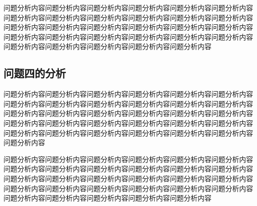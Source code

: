 问题分析内容问题分析内容问题分析内容问题分析内容问题分析内容问题分析内容问题分析内容问题分析内容问题分析内容问题分析内容问题分析内容问题分析内容问题分析内容问题分析内容问题分析内容问题分析内容问题分析内容问题分析内容问题分析内容问题分析内容问题分析内容问题分析内容问题分析内容问题分析内容问题分析内容问题分析内容问题分析内容问题分析内容问题分析内容

\subsection{问题四的分析}

问题分析内容问题分析内容问题分析内容问题分析内容问题分析内容问题分析内容问题分析内容问题分析内容问题分析内容问题分析内容问题分析内容问题分析内容问题分析内容问题分析内容问题分析内容问题分析内容问题分析内容问题分析内容问题分析内容问题分析内容问题分析内容问题分析内容问题分析内容问题分析内容问题分析内容问题分析内容问题分析内容问题分析内容问题分析内容问题分析内容问题分析内容

问题分析内容问题分析内容问题分析内容问题分析内容问题分析内容问题分析内容问题分析内容问题分析内容问题分析内容问题分析内容问题分析内容问题分析内容问题分析内容问题分析内容问题分析内容问题分析内容问题分析内容问题分析内容问题分析内容问题分析内容问题分析内容问题分析内容问题分析内容问题分析内容问题分析内容问题分析内容问题分析内容问题分析内容问题分析内容
